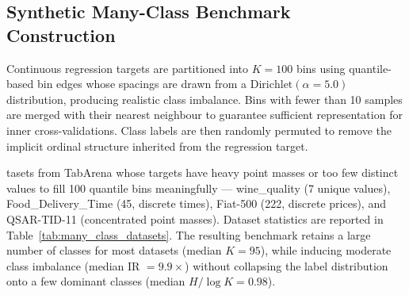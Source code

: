 \subsection{Synthetic Many-Class Benchmark Construction}
\label{app:many_class_construction}

Continuous regression targets are partitioned into $K = 100$ bins using quantile-based
bin edges whose spacings are drawn from a $\mathrm{Dirichlet}(\alpha{=}5.0)$
distribution, producing realistic class imbalance. Bins with fewer than 10 samples are merged
with their nearest neighbour to guarantee sufficient representation for inner cross-validations. 
Class labels are then randomly permuted to remove the implicit ordinal structure inherited from the regression target.

tasets from TabArena whose targets have heavy point masses or too few distinct values to fill 100 quantile bins meaningfully — wine\_quality (7 unique values), Food\_Delivery\_Time (45, discrete times), Fiat-500 (222, discrete prices), and QSAR-TID-11 (concentrated point masses). Dataset statistics are reported in Table~\ref{tab:many_class_datasets}. The resulting benchmark retains a large number of classes for most datasets (median $K=95$), while inducing moderate class imbalance (median IR $=9.9\times$) without collapsing the label distribution onto a few dominant classes (median $H/\log K=0.98$).

